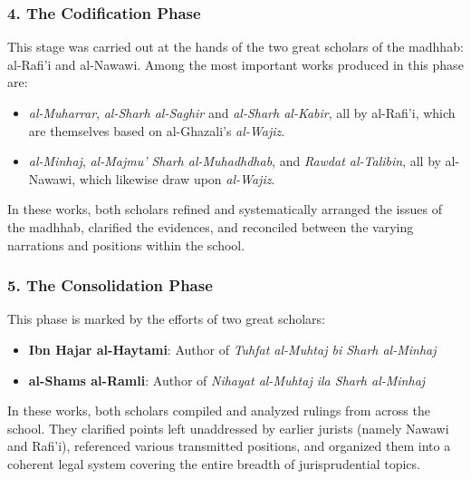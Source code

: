 \documentclass[
  a4paper,
  DIV=11,
  numbers=noendperiod]{scrartcl}
\providecommand{\tightlist}{%
  \setlength{\itemsep}{0pt}\setlength{\parskip}{0pt}}
\begin{document}
\subsubsection{4. The Codification Phase}\label{the-codification-phase}

This stage was carried out at the hands of the two great scholars of the
madhhab: al-Rafi'i and al-Nawawi. Among the most important works
produced in this phase are:

\begin{itemize}
\tightlist
\item
  \emph{al-Muharrar}, \emph{al-Sharh al-Saghir} and \emph{al-Sharh
  al-Kabir}, all by al-Rafi'i, which are themselves based on
  al-Ghazali's \emph{al-Wajiz}.
\item
  \emph{al-Minhaj}, \emph{al-Majmu' Sharh al-Muhadhdhab}, and
  \emph{Rawdat al-Talibin}, all by al-Nawawi, which likewise draw upon
  \emph{al-Wajiz}.
\end{itemize}

In these works, both scholars refined and systematically arranged the
issues of the madhhab, clarified the evidences, and reconciled between
the varying narrations and positions within the school.

\subsubsection{5. The Consolidation
Phase}\label{the-consolidation-phase}

This phase is marked by the efforts of two great scholars:

\begin{itemize}
\tightlist
\item
  \textbf{Ibn Hajar al-Haytami}: Author of \emph{Tuhfat al-Muhtaj bi
  Sharh al-Minhaj}\\
\item
  \textbf{al-Shams al-Ramli}: Author of \emph{Nihayat al-Muhtaj ila
  Sharh al-Minhaj}
\end{itemize}

In these works, both scholars compiled and analyzed rulings from across
the school. They clarified points left unaddressed by earlier jurists
(namely Nawawi and Rafi'i), referenced various transmitted positions,
and organized them into a coherent legal system covering the entire
breadth of jurisprudential topics.
\end{document}

